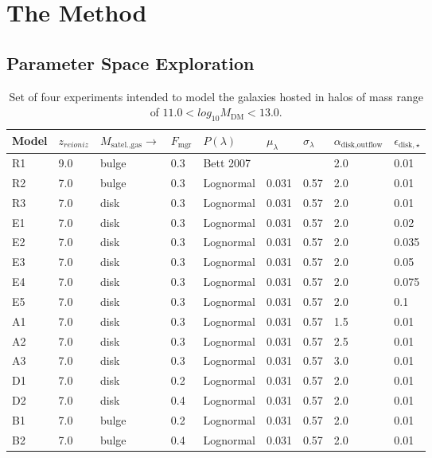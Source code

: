 \documentclass[usenatbib]{mn2e}
\begin{document}
\section{The Method}
\label{sec:method}



\subsection{Parameter Space Exploration}
\label{sec:method:numericals}
\begin{table}\tiny
\centering
\resizebox{7in}{!} {
\begin{tabular}{|l|l|l|l|l|l|l|l|l|}
\hline
\hline
Model  &  $z_{reioniz}$ &  $M_{\text{satel.,gas}}\to$  & $F_{\text{mgr}}$ & $P(\lambda)$  &  $\mu_\lambda$
 & $\sigma_\lambda$  & $\alpha_{\text{disk,outflow}}$ & $\epsilon_{\text{disk},\star}$ \\
\hline
\hline
R1 & 9.0 &  bulge & 0.3 &Bett 2007 & &  & 2.0 & 0.01 \\
R2 & 7.0 &  bulge & 0.3 &Lognormal & 0.031 & 0.57 & 2.0 & 0.01 \\
R3 & 7.0 &  disk & 0.3 &Lognormal & 0.031  & 0.57 & 2.0 & 0.01 \\
\hline
E1 & 7.0 &  disk & 0.3 &Lognormal & 0.031 & 0.57 & 2.0 & 0.02 \\
E2 & 7.0 &  disk & 0.3 &Lognormal & 0.031 & 0.57 & 2.0 & 0.035 \\
E3 & 7.0 &  disk & 0.3 &Lognormal & 0.031 & 0.57 & 2.0 & 0.05 \\
E4 & 7.0 &  disk & 0.3 &Lognormal & 0.031 & 0.57 & 2.0 & 0.075 \\
E5 & 7.0 &  disk & 0.3 &Lognormal & 0.031 & 0.57 & 2.0 & 0.1 \\
\hline
A1 & 7.0 &  disk & 0.3 &Lognormal & 0.031 & 0.57 & 1.5 & 0.01 \\
A2 & 7.0 &  disk & 0.3 &Lognormal & 0.031 & 0.57 & 2.5 & 0.01 \\
A3 & 7.0 &  disk & 0.3 &Lognormal & 0.031 & 0.57 & 3.0 & 0.01 \\
\hline
D1 & 7.0 &  disk & 0.2 &Lognormal & 0.031 & 0.57 & 2.0 & 0.01 \\
D2 & 7.0 &  disk & 0.4 &Lognormal & 0.031 & 0.57 & 2.0 & 0.01 \\
\hline
B1 & 7.0 &  bulge & 0.2 &Lognormal & 0.031 & 0.57 & 2.0 & 0.01 \\
B2 & 7.0 &  bulge & 0.4 &Lognormal & 0.031 & 0.57 & 2.0 & 0.01 \\
\hline
\hline
\end{tabular}
}
\caption{Set of four experiments intended to model the galaxies hosted in  halos of mass range of $11.0<log_{10} M_{\text{DM}}<13.0$.\label{tab:runs}}
\end{table}
\end{document}
